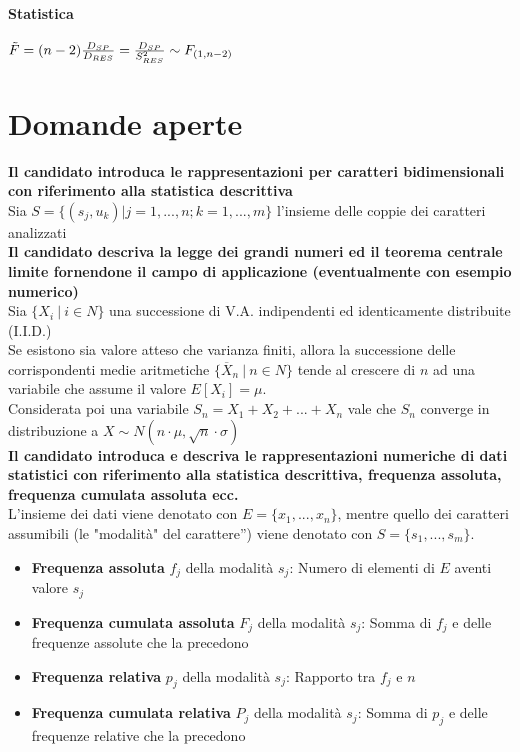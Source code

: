 \documentclass[12pt]{article}
\begin{document}
    \paragraph{Statistica} $\tilde{F}=(n-2){D_{SP} \over D_{RES}}= {D_{SP} \over S^2_{RES}} \sim F_{(1, n-2)}$
    
    
    \newpage
    \section{Domande aperte}
    \textbf{Il candidato introduca le rappresentazioni per caratteri bidimensionali con riferimento alla statistica descrittiva}
    \\[5pt]
    Sia $S=\{(s_j, u_k) | j = 1, ..., n; k = 1, ..., m\}$ l'insieme delle coppie dei caratteri analizzati
    \\[12pt]
    \textbf{Il candidato descriva la legge dei grandi numeri ed il teorema centrale limite fornendone il campo di applicazione (eventualmente con esempio numerico)}
    \\[5pt]
    Sia $\{X_i \ | \ i\in N\}$ una successione di V.A. indipendenti ed identicamente distribuite (I.I.D.)
    \\Se esistono sia valore atteso che varianza finiti, allora la successione delle corrispondenti medie aritmetiche $\{\overline{X}_n \ | \ n\in N\}$ tende al crescere di $n$ ad una variabile che assume il valore $E[X_i] = \mu$.
    \\Considerata poi una variabile $S_n = X_1 + X_2 + ... + X_n$ vale che $S_n$ converge in distribuzione a $X \sim N(n \cdot \mu, {\sqrt{n} \cdot \sigma })$
    \\[12pt]
    \textbf{Il candidato introduca e descriva le rappresentazioni numeriche di dati statistici con riferimento alla statistica descrittiva, frequenza assoluta, frequenza cumulata assoluta ecc.}
    \\[5pt]
    L'insieme  dei  dati  viene  denotato  con $E=\{x_1, ..., x_n\}$, mentre quello dei caratteri assumibili (le "modalità"  del  carattere”) viene denotato con $S=\{s_1, ..., s_m\}$.
    \begin{itemize}
        \item \textbf{Frequenza assoluta} $f_j$ della modalità $s_j$: Numero di elementi di $E$ aventi valore $s_j$
        \item \textbf{Frequenza cumulata assoluta} $F_j$ della modalità $s_j$: Somma di $f_j$ e delle frequenze assolute che la precedono
        \item \textbf{Frequenza relativa} $p_j$ della modalità $s_j$: Rapporto tra $f_j$ e $n$
        \item \textbf{Frequenza cumulata relativa} $P_j$ della modalità $s_j$: Somma di $p_j$ e delle frequenze relative che la precedono
    \end{itemize}
    \newpage
\end{document}
